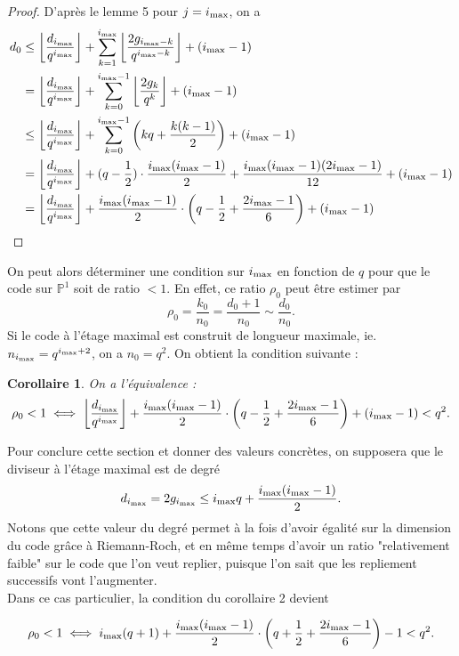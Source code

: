 \documentclass[10pt]{article}
\newtheorem{coro1}{Corollaire}[]
\newcommand{\cd}{\cdot}
\newcommand{\ii}{i_{\rm{max}}}
\begin{document}
\begin{proof}
D'après le lemme 5 pour $j=\ii$, on a
\begin{align*}
d_0 &\leq \left\lfloor \dfrac{d_{\ii}}{q^{\ii}}\right\rfloor + \sum\limits_{k=1}^{\ii} \left\lfloor \dfrac{2g_{\ii -k}}{q^{\ii-k}}\right\rfloor + (\ii-1) \\
	&= \left\lfloor \dfrac{d_{\ii}}{q^{\ii}}\right\rfloor + \sum\limits_{k=0}^{\ii-1} \left\lfloor \dfrac{2g_k}{q^k}\right\rfloor + (\ii-1) \\
	& \leq \left\lfloor \dfrac{d_{\ii}}{q^{\ii}}\right\rfloor + \sum\limits_{k=0}^{\ii-1} \left(kq + \dfrac{k(k-1)}{2}\right) + (\ii-1) \\
	&= \left\lfloor \dfrac{d_{\ii}}{q^{\ii}}\right\rfloor + (q-\frac{1}{2}) \cd \dfrac{\ii(\ii-1)}{2} + \dfrac{\ii(\ii-1)(2\ii-1)}{12} + (\ii-1) \\
	&= \left\lfloor \dfrac{d_{\ii}}{q^{\ii}}\right\rfloor + \dfrac{\ii(\ii-1)}{2}\cd \left(q-\frac{1}{2} + \frac{2\ii-1}{6}\right) + (\ii-1) \\
\end{align*}
\end{proof}

On peut alors déterminer une condition sur $\ii$ en fonction de $q$ pour que le code sur $\mathbb{P}^1$ soit de ratio $< 1$. En effet, ce ratio $\rho_0$ peut être estimer par 
\[ \rho_0 = \dfrac{k_0}{n_0} = \dfrac{d_0+1}{n_0} \sim \dfrac{d_0}{n_0}.\]
Si le code à l'étage maximal est construit de longueur maximale, ie. $n_{\ii} = q^{\ii+2}$, on a $n_0=q^2$. On obtient la condition suivante :

\begin{coro1}
On a l'équivalence :
\[ \rho_0 < 1 \iff \left\lfloor \dfrac{d_{\ii}}{q^{\ii}}\right\rfloor + \dfrac{\ii(\ii-1)}{2}\cd \left(q-\frac{1}{2} + \frac{2\ii-1}{6}\right) + (\ii-1) < q^2.\]
\end{coro1}

Pour conclure cette section et donner des valeurs concrètes, on supposera que le diviseur à l'étage maximal est de degré 
\[d_{\ii} = 2g_{\ii} \leq \ii q + \dfrac{\ii(\ii-1)}{2}.\]
Notons que cette valeur du degré permet à la fois d'avoir égalité sur la dimension du code grâce à Riemann-Roch, et en même temps d'avoir un ratio "relativement faible" sur le code que l'on veut replier, puisque l'on sait que les repliement successifs vont l'augmenter. \\
Dans ce cas particulier, la condition du corollaire 2 devient

\[ \rho_0 < 1 \iff \ii(q+1) + \dfrac{\ii(\ii-1)}{2}\cd \left(q+\frac{1}{2} + \frac{2\ii-1}{6}\right) -1 < q^2.\]
\end{document}
